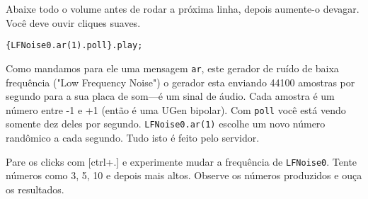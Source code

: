 Abaixe todo o volume antes de rodar a próxima linha, depois aumente-o devagar. Você deve ouvir cliques suaves.

\begin{lstlisting}[style=SuperCollider-IDE, basicstyle=\scttfamily\footnotesize]
{LFNoise0.ar(1).poll}.play;
\end{lstlisting}

Como mandamos para ele uma mensagem \texttt{ar}, este gerador de ruído de baixa frequência ("Low Frequency Noise") o gerador esta enviando 44100 amostras por segundo para a sua placa de som---é um sinal de áudio. Cada amostra é um número entre -1 e +1 (então é uma UGen bipolar). Com \texttt{poll} você está vendo somente dez deles por segundo. \texttt{LFNoise0.ar(1)} escolhe um novo número randômico a cada segundo. Tudo isto é feito pelo servidor.

Pare os clicks com [ctrl+.] e experimente mudar a frequência de \texttt{LFNoise0}. Tente números como 3, 5, 10 e depois mais altos. Observe os números produzidos e ouça os resultados.
